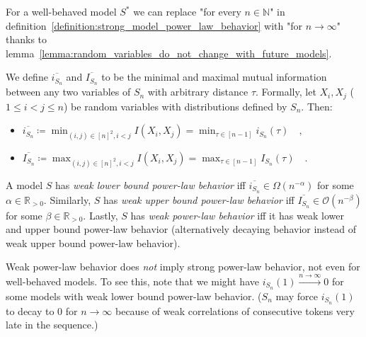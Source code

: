 \documentclass[../../main.tex]{subfiles}
\begin{document}
    \begin{corollary}
        For a well-behaved model $S^*$ we can replace "for every $n \in \mathbb{N}$" in definition~\ref{definition:strong_model_power_law_behavior} with "for $n \to \infty$" thanks to lemma~\ref{lemma:random_variables_do_not_change_with_future_models}.
    \end{corollary}

    \begin{definition}
        We define $\overline{i_{S_n}}$ and $\overline{I_{S_n}}$ to be the minimal and maximal mutual information between any two variables of $S_n$ with arbitrary distance $\tau$. Formally, let $X_i, X_j$ ($1 \leq i < j \leq n$) be random variables with distributions defined by $S_n$. Then:
        \vspace{-1em}
        \begin{itemize}
            \item $\overline{i_{S_n}} \coloneqq \min_{(i, j) \in [n]^2, i < j} I(X_i, X_j) = \min_{\tau \in [n - 1]} i_{S_n}(\tau) \quad ,$
            \item $\overline{I_{S_n}} \coloneqq \max_{(i, j) \in [n]^2, i < j} I(X_i, X_j) = \max_{\tau \in [n - 1]} I_{S_n}(\tau) \quad .$
        \end{itemize}
    \end{definition}

    \begin{definition}
        A model $S$ has \emph{weak lower bound power-law behavior} iff $\overline{i_{S_n}} \in \Omega(n^{-\alpha})$ for some $\alpha \in \mathbb{R}_{>0}$. Similarly, $S$ has \emph{weak upper bound power-law behavior} iff $\overline{I_{S_n}} \in \mathcal{O}(n^{-\beta})$ for some $\beta \in \mathbb{R}_{>0}$. Lastly, $S$ has \emph{weak power-law behavior} iff it has weak lower and upper bound power-law behavior (alternatively decaying behavior instead of weak upper bound power-law behavior).
    \end{definition}

    \begin{remark}
        Weak power-law behavior does \emph{not} imply strong power-law behavior, not even for well-behaved models. To see this, note that we might have  $i_{S_n}(1) \xrightarrow{n \to \infty} 0$ for some models with weak lower bound power-law behavior. ($S_n$ may force $i_{S_n}(1)$ to decay to $0$ for $n \to \infty$ because of weak correlations of consecutive tokens very late in the sequence.)
    \end{remark}
\end{document}
